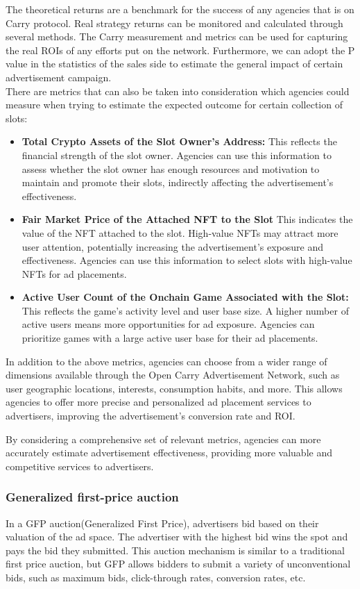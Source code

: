 The theoretical returns are a benchmark for the success of any agencies that is on Carry protocol. Real strategy returns can be monitored and calculated through several methods. The Carry measurement and metrics can be used for capturing the real ROIs of any efforts put on the network. Furthermore, we can adopt the P value in the statistics of the sales side to estimate the general impact of certain advertisement campaign.\\

There are metrics that can also be taken into consideration which agencies could measure when trying to estimate the expected outcome for certain collection of slots:

\begin{itemize}
    \item \textbf{Total Crypto Assets of the Slot Owner's Address:} This reflects the financial strength of the slot owner. Agencies can use this information to assess whether the slot owner has enough resources and motivation to maintain and promote their slots, indirectly affecting the advertisement’s effectiveness.
    \item \textbf{Fair Market Price of the Attached NFT to the Slot} This indicates the value of the NFT attached to the slot. High-value NFTs may attract more user attention, potentially increasing the advertisement’s exposure and effectiveness. Agencies can use this information to select slots with high-value NFTs for ad placements.
    \item \textbf{Active User Count of the Onchain Game Associated with the Slot:} This reflects the game’s activity level and user base size. A higher number of active users means more opportunities for ad exposure. Agencies can prioritize games with a large active user base for their ad placements.
\end{itemize}

In addition to the above metrics, agencies can choose from a wider range of dimensions available through the Open Carry Advertisement Network, such as user geographic locations, interests, consumption habits, and more. This allows agencies to offer more precise and personalized ad placement services to advertisers, improving the advertisement’s conversion rate and ROI.

By considering a comprehensive set of relevant metrics, agencies can more accurately estimate advertisement effectiveness, providing more valuable and competitive services to advertisers.

\subsubsection{Generalized first-price auction}
In a GFP auction(Generalized First Price), advertisers bid based on their valuation of the ad space. The advertiser with the highest bid wins the spot and pays the bid they submitted. This auction mechanism is similar to a traditional first price auction, but GFP allows bidders to submit a variety of unconventional bids, such as maximum bids, click-through rates, conversion rates, etc.

